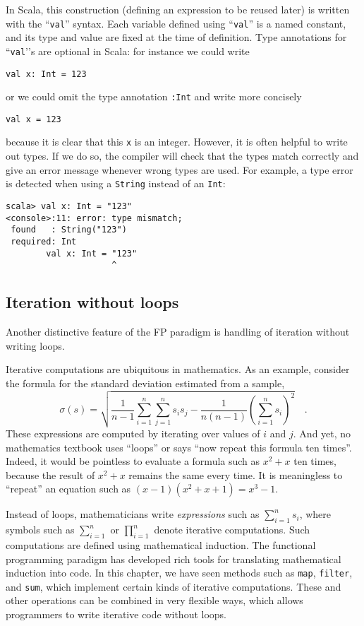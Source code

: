 In Scala, this construction (defining an expression to be reused later)
is written with the \textsf{``}\lstinline!val!\textsf{''} syntax. Each variable defined
using \textsf{``}\lstinline!val!\textsf{''} is a named constant, and its type and
value are fixed at the time of definition. Type annotations for \textsf{``}\lstinline!val!'\textsf{'}s
are optional in Scala: for instance we could write 
\begin{lstlisting}
val x: Int = 123
\end{lstlisting}
or we could omit the type annotation \lstinline!:Int! and write more
concisely
\begin{lstlisting}
val x = 123
\end{lstlisting}
because it is clear that this \texttt{}\lstinline!x! is an integer.
However, it is often helpful to write out types. If we do so, the
compiler will check that the types match correctly and give an error
message whenever wrong types are used. For example, a type error is
detected when using a \lstinline!String! instead of an \lstinline!Int!:
\begin{lstlisting}
scala> val x: Int = "123"
<console>:11: error: type mismatch;
 found   : String("123")
 required: Int
        val x: Int = "123"
                     ^
\end{lstlisting}


\subsection{Iteration without loops}

Another distinctive feature of the FP paradigm is handling of iteration
without writing loops.

Iterative computations are ubiquitous in mathematics. As an example,
consider the formula for the standard deviation estimated from a sample,
\[
\sigma(s)=\sqrt{\frac{1}{n-1}\sum_{i=1}^{n}\sum_{j=1}^{n}s_{i}s_{j}-\frac{1}{n\left(n-1\right)}\left(\sum_{i=1}^{n}s_{i}\right)^{2}}\quad.
\]
These expressions are computed by iterating over values of $i$ and
$j$. And yet, no mathematics textbook uses \textsf{``}loops\textsf{''} or says \textsf{``}now
repeat this formula ten times\textsf{''}. Indeed, it would be pointless to
evaluate a formula such as $x^{2}+x$ ten times, because the result
of $x^{2}+x$ remains the same every time. It is meaningless to \textsf{``}repeat\textsf{''}
an equation such as $\left(x-1\right)(x^{2}+x+1)=x^{3}-1$.

Instead of loops, mathematicians write \emph{expressions} such as
$\sum_{i=1}^{n}s_{i}$, where symbols such as $\sum_{i=1}^{n}$ or
$\prod_{i=1}^{n}$ denote iterative computations. Such computations
are defined using mathematical induction.
The functional programming paradigm has developed rich tools for translating
mathematical induction into code. In this chapter, we have seen methods
such as \lstinline!map!, \lstinline!filter!, and \lstinline!sum!,
which implement certain kinds of iterative computations. These and
other operations can be combined in very flexible ways, which allows
programmers to write iterative code without loops.

